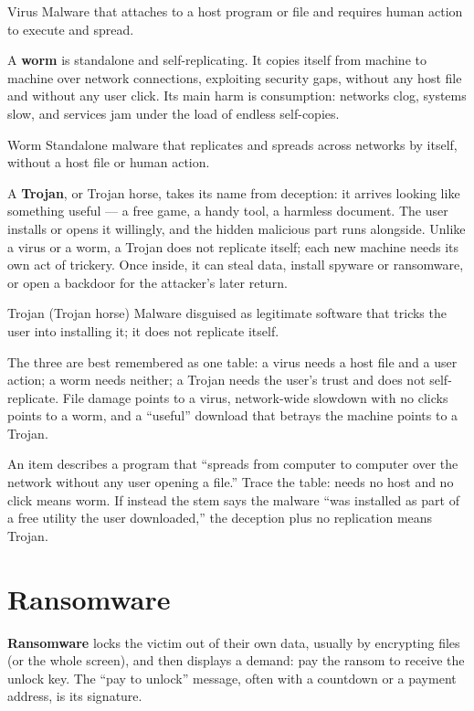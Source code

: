 \begin{definitionbox}{Virus}
Malware that attaches to a host program or file and requires human action
to execute and spread.
\end{definitionbox}

A \textbf{worm} is standalone and self-replicating. It copies itself from
machine to machine over network connections, exploiting security gaps,
without any host file and without any user click. Its main harm is
consumption: networks clog, systems slow, and services jam under the load
of endless self-copies.

\begin{definitionbox}{Worm}
Standalone malware that replicates and spreads across networks by itself,
without a host file or human action.
\end{definitionbox}

A \textbf{Trojan}, or Trojan horse, takes its name from deception: it
arrives looking like something useful --- a free game, a handy tool, a
harmless document. The user installs or opens it willingly, and the hidden
malicious part runs alongside. Unlike a virus or a worm, a Trojan does not
replicate itself; each new machine needs its own act of trickery. Once
inside, it can steal data, install spyware or ransomware, or open a backdoor
for the attacker's later return.

\begin{definitionbox}{Trojan (Trojan horse)}
Malware disguised as legitimate software that tricks the user into
installing it; it does not replicate itself.
\end{definitionbox}

The three are best remembered as one table: a virus needs a host file and a
user action; a worm needs neither; a Trojan needs the user's trust and does
not self-replicate. File damage points to a virus, network-wide slowdown
with no clicks points to a worm, and a ``useful'' download that betrays the
machine points to a Trojan.

\begin{example}
An item describes a program that ``spreads from computer to computer over
the network without any user opening a file.'' Trace the table: needs no
host and no click means worm. If instead the stem says the malware ``was
installed as part of a free utility the user downloaded,'' the deception
plus no replication means Trojan.
\end{example}

\section{Ransomware}
\textbf{Ransomware} locks the victim out of their own data, usually by
encrypting files (or the whole screen), and then displays a demand: pay the
ransom to receive the unlock key. The ``pay to unlock'' message, often with
a countdown or a payment address, is its signature.

